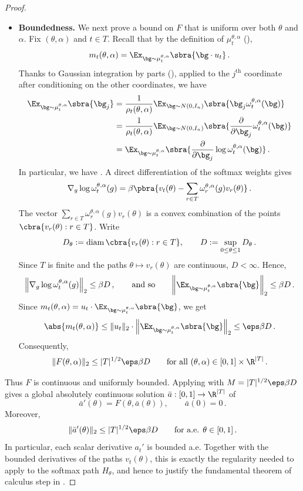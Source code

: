 \documentclass[11pt]{article}
\newcommand{\diam}{\operatorname{diam}}
\begin{document}
\begin{proof}
\begin{itemize}
		\item \textbf{Boundedness.} 
		We next prove a bound on $F$ that is uniform over both $\theta$ and $\alpha$.
		Fix $(\theta,\alpha)$ and $t\in T$.
		Recall that by the definition of $\mu_t^{\theta,\alpha}$ (),
		\[
			m_t(\theta,\alpha)
			=
			\Ex_{\bg\sim\mu_t^{\theta,\alpha}}\sbra{\bg\cdot u_t}\,.
		\]
		Thanks to Gaussian integration by parts (), applied to the $j^\text{th}$ coordinate after conditioning on the other coordinates, we have 
		\begin{align*}
			\Ex_{\bg\sim\mu_t^{\theta,\alpha}}\sbra{\bg_j}
			&=
			\frac{1}{\rho_t(\theta,\alpha)}
			\Ex_{\bg\sim N(0,I_n)}\sbra{\bg_j \omega_t^{\theta,\alpha}(\bg)}
			\\
			&=
			\frac{1}{\rho_t(\theta,\alpha)}
			\Ex_{\bg\sim N(0,I_n)}\sbra{\frac{\partial}{\partial \bg_j} \omega_t^{\theta,\alpha}(\bg)}
			\\
			&=
			\Ex_{\bg\sim\mu_t^{\theta,\alpha}}\sbra{\frac{\partial}{\partial \bg_j}\log \omega_t^{\theta,\alpha}(\bg)}\,.
		\end{align*}
		In particular, we have 
		.
		A direct differentiation of the softmax weights gives
		\[
			\nabla_g\log \omega_t^{\theta,\alpha}(g)
			=
			\beta\pbra{
			v_t(\theta)
			-
			\sum_{r\in T}\omega_r^{\theta,\alpha}(g)v_r(\theta)
			}\,.
		\]
		The vector $\sum_{r\in T}\omega_r^{\theta,\alpha}(g)v_r(\theta)$ is a convex combination of the points $\cbra{v_r(\theta):r\in T}$.
		Write
		\[
			D_\theta
			:=
			\diam\cbra{v_r(\theta):r\in T},
			\qquad
			D
			:=
			\sup_{0\leq\theta\leq 1}D_\theta\,.
		\]
		Since $T$ is finite and the paths $\theta\mapsto v_r(\theta)$ are continuous, $D<\infty$.
		Hence, 
		\[
			\left\|
			\nabla_g\log \omega_t^{\theta,\alpha}(g)
			\right\|_2
			\leq
			\beta D\,,
			\qquad\text{and so}\qquad 
			\bigg\|
			\Ex_{\bg\sim\mu_t^{\theta,\alpha}}\sbra{\bg}
			\bigg\|_2
			\leq
			\beta D\,.
		\]
		Since $m_t(\theta,\alpha)=u_t\cdot\Ex_{\bg\sim\mu_t^{\theta,\alpha}}\sbra{\bg}$, we get
		\[
			\abs{m_t(\theta,\alpha)}
			\leq
			\|u_t\|_2 
			\cdot 
			\left\|
			\Ex_{\bg\sim\mu_t^{\theta,\alpha}}\sbra{\bg}
			\right\|_2
			\leq
			\eps\beta D\,.
		\]
		Consequently,
		\[
			\|F(\theta,\alpha)\|_2
			\leq
			|T|^{1/2}\eps\beta D
			\qquad
			\text{for all }(\theta,\alpha)\in[0,1]\times\R^{|T|}\,.
		\]
	\end{itemize}
	Thus $F$ is continuous and uniformly bounded.
	Applying  with $M=|T|^{1/2}\eps\beta D$ gives a global absolutely continuous solution $\bar{a}:[0,1]\to\R^{|T|}$ of
	\[
		\bar{a}'(\theta)=F(\theta,\bar{a}(\theta)),
		\qquad
		\bar{a}(0)=0\,.
	\]
	Moreover,
	\[
		\|\bar{a}'(\theta)\|_2
		\leq
		|T|^{1/2}\eps\beta D
		\qquad
		\text{for a.e. }\theta\in[0,1]\,.
	\]
	In particular, each scalar derivative $a_t'$ is bounded a.e.
	Together with the bounded derivatives of the paths $v_t(\theta)$, this is exactly the regularity needed to apply  to the softmax path $H_\theta$, and hence to justify the fundamental theorem of calculus step in .


\end{proof}
\end{document}
